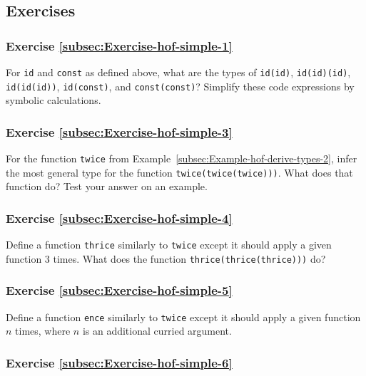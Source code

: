 \subsection{Exercises}

\subsubsection{Exercise \label{subsec:Exercise-hof-simple-1}\ref{subsec:Exercise-hof-simple-1}}

For \lstinline!id! and \lstinline!const! as defined above, what
are the types of \lstinline!id(id)!, \lstinline!id(id)(id)!, \lstinline!id(id(id))!,
\lstinline!id(const)!, and \lstinline!const(const)!? Simplify these
code expressions by symbolic calculations.

\subsubsection{Exercise \label{subsec:Exercise-hof-simple-3}\ref{subsec:Exercise-hof-simple-3}}

For the function \lstinline!twice! from Example~\ref{subsec:Example-hof-derive-types-2},
infer the most general type for the function \lstinline!twice(twice(twice)))!.
What does that function do? Test your answer on an example.

\subsubsection{Exercise \label{subsec:Exercise-hof-simple-4}\ref{subsec:Exercise-hof-simple-4}}

Define a function \lstinline!thrice! similarly to \lstinline!twice!
except it should apply a given function $3$ times. What does the
function \lstinline!thrice(thrice(thrice)))! do?

\subsubsection{Exercise \label{subsec:Exercise-hof-simple-5}\ref{subsec:Exercise-hof-simple-5}}

Define a function \lstinline!ence! similarly to \lstinline!twice!
except it should apply a given function $n$ times, where $n$ is
an additional curried argument.

\subsubsection{Exercise \label{subsec:Exercise-hof-simple-6}\ref{subsec:Exercise-hof-simple-6}}


